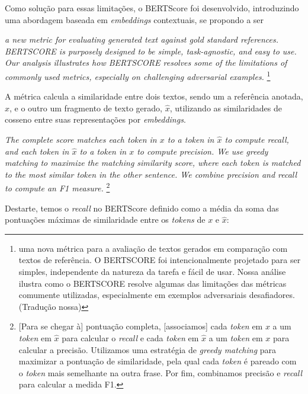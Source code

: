 Como solução para essas limitações, o BERTScore foi desenvolvido, introduzindo uma abordagem baseada em \textit{embeddings} contextuais, se propondo a ser

\begin{citacao}
    \textit{a new metric for evaluating generated text against gold standard references. BERTSCORE is purposely designed to be simple, task-agnostic, and easy to use. Our analysis illustrates how BERTSCORE resolves some of the limitations of commonly used metrics, especially on challenging adversarial examples.} \cite{BERTScore:1}
    \footnote{uma nova métrica para a avaliação de textos gerados em comparação com textos de referência. O BERTSCORE foi intencionalmente projetado para ser simples, independente da natureza da tarefa e fácil de usar. Nossa análise ilustra como o BERTSCORE resolve algumas das limitações das métricas comumente utilizadas, especialmente em exemplos adversariais desafiadores. (Tradução nossa)}
\end{citacao}

A métrica calcula a similaridade entre dois textos, sendo um a referência anotada, \(x\), e o outro um fragmento de texto gerado, \(\hat{x}\), utilizando as similaridades de cosseno entre suas representações por \textit{embeddings}. 

\begin{citacao}
    
    \textit{The complete score matches each token in \(x\) to a token in \(\hat{x}\) to compute recall, and each token in \(\hat{x}\) to a token in \(x\) to compute precision. We use greedy matching to maximize the matching similarity score, where each token is matched to the most similar token in the other sentence. We combine precision and recall to compute an F1 measure.} \cite{BERTScore:1}
    \footnote{[Para se chegar à] pontuação completa, [associamos] cada \textit{token} em \(x\) a um \textit{token} em \(\hat{x}\) para calcular o \textit{recall} e cada \textit{token} em \(\hat{x}\) a um \textit{token} em \(x\) para calcular a precisão. Utilizamos uma estratégia de \textit{greedy matching} para maximizar a pontuação de similaridade, pela qual cada \textit{token} é pareado com o \textit{token} mais semelhante na outra frase. Por fim, combinamos precisão e \textit{recall} para calcular a medida F1.}
\end{citacao}

Destarte, temos o \textit{recall} no BERTScore definido como a média da soma das pontuações máximas de similaridade entre os \textit{tokens} de \(x\) e \(\hat{x}\):

